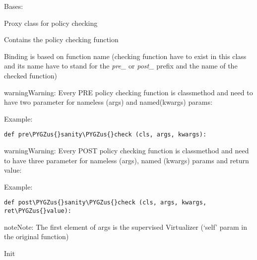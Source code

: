\documentclass[letterpaper,10pt,english]{sphinxmanual}
\def\PYGZus{\char`\_}
\begin{document}

\begin{fulllineitems}
\label{orchest/policy_enforcement:escape.orchest.policy_enforcement.PolicyEnforcement}
Bases: \href{https://docs.python.org/2.7/library/functions.html\#object}{}

Proxy class for policy checking

Contains the policy checking function

Binding is based on function name (checking function have to exist in this
class and its name have to stand for the \emph{pre\_} or \emph{post\_} prefix and the
name of the checked function)

\begin{notice}{warning}{Warning:}
Every PRE policy checking function is classmethod and need to have two
parameter for nameless (args) and named(kwargs) params:
\end{notice}

Example:

\begin{Verbatim}[commandchars=\\\{\}]
def pre\PYGZus{}sanity\PYGZus{}check (cls, args, kwargs):
\end{Verbatim}

\begin{notice}{warning}{Warning:}
Every POST policy checking function is classmethod and need to have three
parameter for nameless (args), named (kwargs) params and return value:
\end{notice}

Example:

\begin{Verbatim}[commandchars=\\\{\}]
def post\PYGZus{}sanity\PYGZus{}check (cls, args, kwargs, ret\PYGZus{}value):
\end{Verbatim}

\begin{notice}{note}{Note:}
The first element of args is the supervised Virtualizer (`self' param in the
original function)
\end{notice}

\begin{fulllineitems}
\label{orchest/policy_enforcement:escape.orchest.policy_enforcement.PolicyEnforcement.__init__}
Init


\end{fulllineitems}
\end{fulllineitems}
\end{document}
